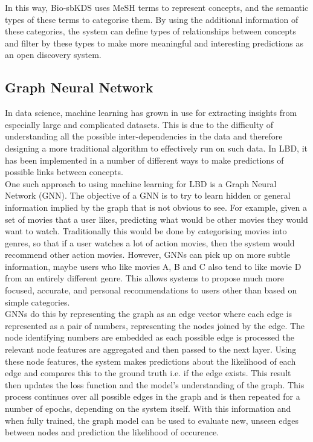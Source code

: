 \documentclass{l4proj}
\begin{document}
In this way, Bio-sbKDS uses MeSH terms to represent concepts, and the semantic types of these terms to categorise them. By using the additional information of these categories, the system can define types of relationships between concepts and filter by these types to make more meaningful and interesting predictions as an open discovery system. \\ 

\subsection{Graph Neural Network}

In data science, machine learning has grown in use for extracting insights from especially large and complicated datasets. This is due to the difficulty of understanding all the possible inter-dependencies in the data and therefore designing a more traditional algorithm to effectively run on such data. In LBD, it has been implemented in a number of different ways to make predictions of possible links between concepts. \\

One such approach to using machine learning for LBD is a Graph Neural Network (GNN). The objective of a GNN is to try to learn hidden or general information implied by the graph that is not obvious to see. For example, given a set of movies that a user likes, predicting what would be other movies they would want to watch. Traditionally this would be done by categorising movies into genres, so that if a user watches a lot of action movies, then the system would recommend other action movies. However, GNNs can pick up on more subtle information, maybe users who like movies A, B and C also tend to like movie D from an entirely different genre. This allows systems to propose much more focused, accurate, and personal recommendations to users other than based on simple categories. \\

GNNs do this by representing the graph as an edge vector where each edge is represented as a pair of numbers, representing the nodes joined by the edge. The node identifying numbers are embedded as each possible edge is processed the relevant node features are aggregated and then passed to the next layer. Using these node features, the system makes predictions about the likelihood of each edge and compares this to the ground truth i.e. if the edge exists. This result then updates the loss function and the model's understanding of the graph. This process continues over all possible edges in the graph and is then repeated for a number of epochs, depending on the system itself. With this information and when fully trained, the graph model can be used to evaluate new, unseen edges between nodes and prediction the likelihood of occurence. \\
\end{document}
